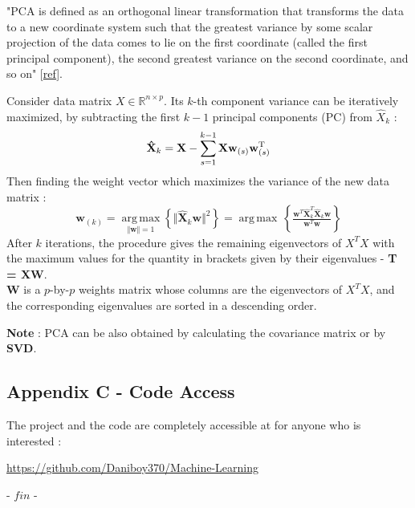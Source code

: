 \documentclass[12pt]{article}
\numberwithin{equation}{section}
\begin{document}
\begin{flushleft}
"PCA is defined as an orthogonal linear transformation that transforms the data to a new coordinate system such that the greatest variance by some scalar projection of the data comes to lie on the first coordinate (called the first principal component), the second greatest variance on the second coordinate, and so on" [\href{https://en.wikipedia.org/wiki/Principal_component_analysis#Covariances}{ref}].

Consider data matrix $X \in \mathbb{R}^{n \times p}$. Its $k$-th component variance can be iteratively maximized, by subtracting the first $k-1$ principal components (PC) from $\hat{X}_k$ :
$$\mathbf{\hat{X}}_{k} = \mathbf{X} - \sum_{s = 1}^{k - 1} \mathbf{X} \mathbf{w}_{(s)} \mathbf{w}_{(s)}^{\rm T} $$
Then finding the weight vector which maximizes the variance of the new data matrix :
$$\mathbf{w}_{(k)} = \underset{\Vert \mathbf{w} \Vert = 1}{\operatorname{arg\,max}} \left\{ \Vert \mathbf{\hat{X}}_{k} \mathbf{w} \Vert^2 \right\} = {\operatorname{\arg\,max}}\, \left\{ \tfrac{\mathbf{w}^T\mathbf{\hat{X}}_{k}^T \mathbf{\hat{X}}_{k} \mathbf{w}}{\mathbf{w}^T \mathbf{w}} \right\}$$
After $k$ iterations, the procedure gives the remaining eigenvectors of $X^T X$ with the maximum values for the quantity in brackets given by their eigenvalues - \textbf{T = XW}. \\
\textbf{W} is a $p$-by-$p$ weights matrix whose columns are the eigenvectors of $X^T X$, and the corresponding eigenvalues are sorted in a descending order. 

\textbf{Note} : PCA can be also obtained by calculating the covariance matrix or by \textbf{SVD}.


\subsection*{\hypertarget{three}{Appendix C} - Code Access}
\thispagestyle{empty}

The project and the code are completely accessible at for anyone who is interested : \begin{center}
\url{https://github.com/Daniboy370/Machine-Learning}
\end{center}

\begin{center}
- $fin$ -
\end{center}



\end{flushleft}
\end{document}
